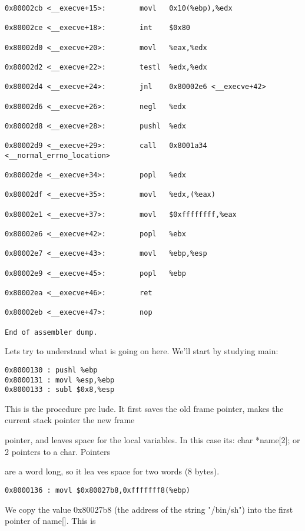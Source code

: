 \documentclass[10pt]{article}
\begin{document}
\begin{lstlisting}
0x80002cb <__execve+15>:        movl   0x10(%ebp),%edx

0x80002ce <__execve+18>:        int    $0x80

0x80002d0 <__execve+20>:        movl   %eax,%edx

0x80002d2 <__execve+22>:        testl  %edx,%edx

0x80002d4 <__execve+24>:        jnl    0x80002e6 <__execve+42>

0x80002d6 <__execve+26>:        negl   %edx

0x80002d8 <__execve+28>:        pushl  %edx

0x80002d9 <__execve+29>:        call   0x8001a34 <__normal_errno_location>

0x80002de <__execve+34>:        popl   %edx

0x80002df <__execve+35>:        movl   %edx,(%eax)

0x80002e1 <__execve+37>:        movl   $0xffffffff,%eax

0x80002e6 <__execve+42>:        popl   %ebx

0x80002e7 <__execve+43>:        movl   %ebp,%esp

0x80002e9 <__execve+45>:        popl   %ebp

0x80002ea <__execve+46>:        ret

0x80002eb <__execve+47>:        nop

End of assembler dump.
\end{lstlisting}

Lets try to understand what is going on here.  We'll start by studying main: 

\begin{lstlisting}
0x8000130 : pushl %ebp
0x8000131 : movl %esp,%ebp
0x8000133 : subl $0x8,%esp
\end{lstlisting}

This is the procedure pre lude. It first saves the old frame pointer, makes the current stack pointer the new frame 

pointer, and leaves space for the local variables. In this case its: char *name[2]; or 2 pointers to a char. Pointers 

are a word long, so it lea ves space for two words (8 bytes).

\begin{lstlisting}
0x8000136 : movl $0x80027b8,0xfffffff8(%ebp)
\end{lstlisting}

We copy the value 0x80027b8 (the address of the string "/bin/sh") into the first pointer of name[]. This is 
\end{document}
